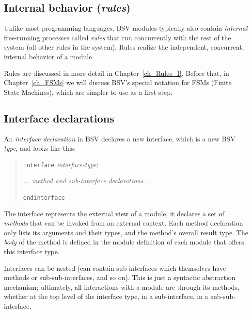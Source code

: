 
\subsection{Internal behavior (\emph{rules})}

\label{Sec_rules1}


Unlike most programming languages, BSV modules typically also contain
\emph{internal} free-running processes called \emph{rules} that run
concurrently with the rest of the system (all other rules in the
system).  Rules realize the independent, concurrent, internal behavior
of a module.

Rules are discussed in more detail in Chapter~\ref{ch_Rules_I}.
Before that, in Chapter~\ref{ch_FSMs} we will discuss BSV's special
notation for FSMs (Finite State Machines), which are simpler to use as
a first step.


\subsection{Interface declarations}


An \emph{interface declaration} in BSV declares a new interface, which
is a new BSV \emph{type}, and looks like this:

\begin{quote}
{\tt interface} \emph{interface-type};

\hmm \emph{... method and sub-interface declarations ...}

{\tt endinterface}
\end{quote}

The interface represents the external view of a module, {\ie} it
declares a set of \emph{methods} that can be invoked from an external
context.  Each method declaration only lists its arguments and their
types, and the method's overall result type.  The \emph{body} of the
method is defined in the module definition of each module that offers
this interface type.

Interfaces can be nested (can contain sub-interfaces which themselves
have methods or sub-sub-interfaces, and so on).  This is just a
syntactic abstraction mechanism; ultimately, all interactions with a
module are through its methods, whether at the top level of the
interface type, in a sub-interface, in a sub-sub-interface, {\etc}

